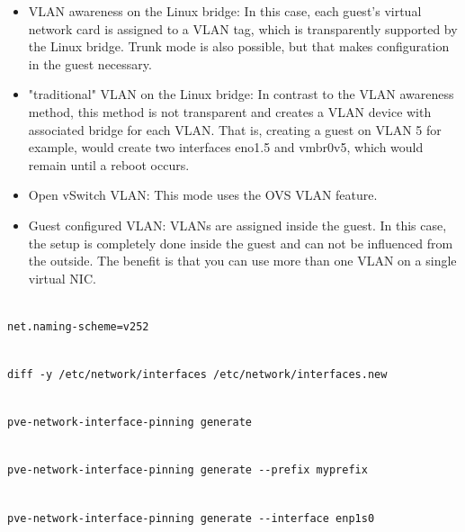 \begin{itemize}[leftmargin=2cm]

	\item VLAN awareness on the Linux bridge: In this case, each guest’s virtual network card is assigned to a VLAN tag, which is transparently supported by the Linux bridge. Trunk mode is also possible, but that makes configuration in the guest necessary.

	\item "traditional" VLAN on the Linux bridge: In contrast to the VLAN awareness method, this method is not transparent and creates a VLAN device with associated bridge for each VLAN. That is, creating a guest on VLAN 5 for example, would create two interfaces eno1.5 and vmbr0v5, which would remain until a reboot occurs.

	\item Open vSwitch VLAN: This mode uses the OVS VLAN feature.

	\item Guest configured VLAN: VLANs are assigned inside the guest. In this case, the setup is completely done inside the guest and can not be influenced from the outside. The benefit is that you can use more than one VLAN on a single virtual NIC.

\end{itemize}

\begin{lstlisting}

net.naming-scheme=v252

\end{lstlisting}

\begin{lstlisting}

diff -y /etc/network/interfaces /etc/network/interfaces.new

\end{lstlisting}

\begin{lstlisting}

pve-network-interface-pinning generate

\end{lstlisting}

\begin{lstlisting}

pve-network-interface-pinning generate --prefix myprefix

\end{lstlisting}

\begin{lstlisting}

pve-network-interface-pinning generate --interface enp1s0

\end{lstlisting}


